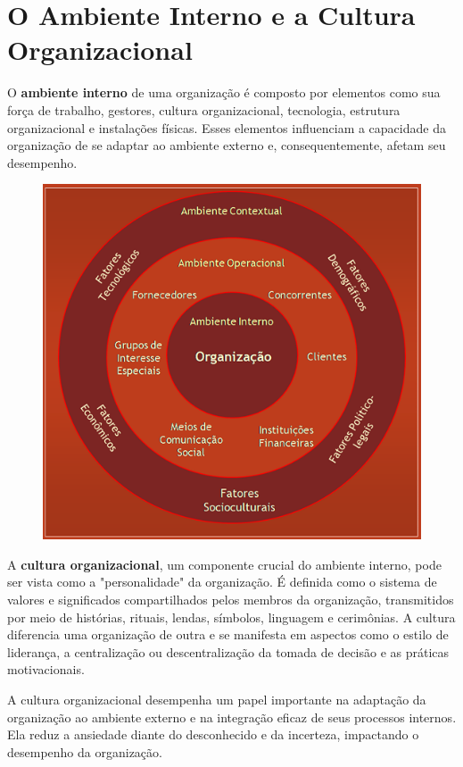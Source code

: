 \section{O Ambiente Interno e a Cultura Organizacional}

O \textbf{ambiente interno} de uma organização é composto por elementos como sua força de trabalho, gestores, cultura organizacional, tecnologia, estrutura organizacional e instalações físicas. Esses elementos influenciam a capacidade da organização de se adaptar ao ambiente externo e, consequentemente, afetam seu desempenho.

\begin{figure}[!h]
    \centering
    \includegraphics{img/imagem1.png}
    \label{fig:exemplo}
\end{figure}

A \textbf{cultura organizacional}, um componente crucial do ambiente interno, pode ser vista como a "personalidade" da organização. É definida como o sistema de valores e significados compartilhados pelos membros da organização, transmitidos por meio de histórias, rituais, lendas, símbolos, linguagem e cerimônias. A cultura diferencia uma organização de outra e se manifesta em aspectos como o estilo de liderança, a centralização ou descentralização da tomada de decisão e as práticas motivacionais.

A cultura organizacional desempenha um papel importante na adaptação da organização ao ambiente externo e na integração eficaz de seus processos internos. Ela reduz a ansiedade diante do desconhecido e da incerteza, impactando o desempenho da organização.

